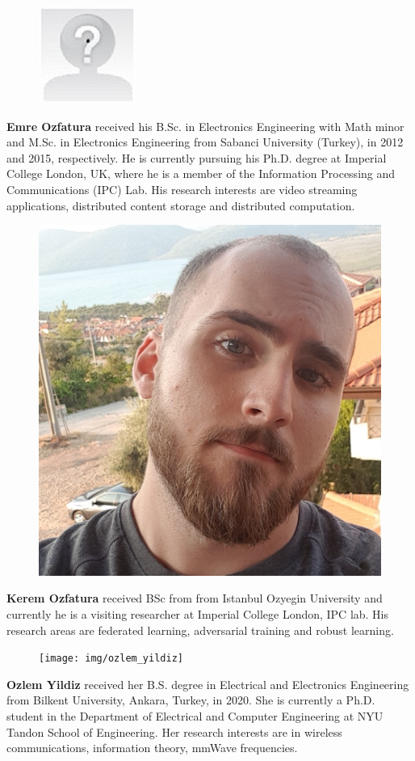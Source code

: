 \documentclass[10pt,a4paper,twocolumn]{article}
\def\startfigure{\vspace{6pt}\begin{figure}[ht]\center}
\begin{document}
\startfigure\includegraphics[width=0.4\columnwidth]{img/yourphotofilename} 
\end{figure} \textbf{Emre Ozfatura} received his B.Sc. in Electronics Engineering with Math minor and M.Sc. in Electronics Engineering from Sabanci University (Turkey), in 2012 and 2015, respectively. He is currently pursuing his Ph.D. degree at Imperial College London, UK, where he is a member of the Information Processing and Communications (IPC) Lab. His research interests are video streaming applications, distributed content storage and distributed computation.

\startfigure\includegraphics[width=0.4\columnwidth]{img/kerem_ozfatura} 
\end{figure} \textbf{Kerem Ozfatura} received BSc from from Istanbul Ozyegin University and currently he is a visiting researcher at Imperial College London, IPC lab. His research areas are federated learning, adversarial training and robust learning.

\startfigure\texttt{[image: img/ozlem\_yildiz]} 
\end{figure} \textbf{Ozlem Yildiz} received her B.S. degree in Electrical and Electronics Engineering from Bilkent University, Ankara, Turkey, in 2020. She is currently a Ph.D. student in the Department of Electrical and Computer Engineering at NYU Tandon School of Engineering. Her research interests are in wireless communications, information theory, mmWave frequencies. 
\end{document}
